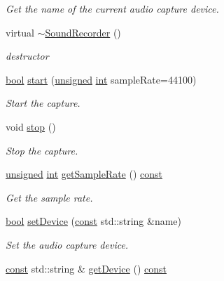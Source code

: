 \begin{DoxyCompactItemize}
\begin{DoxyCompactList}\small\item\em Get the name of the current audio capture device. \end{DoxyCompactList}\item 
virtual \hyperlink{classsf_1_1_sound_recorder_acc599e61aaa47edaae88cf43f0a43549}{$\sim$\-Sound\-Recorder} ()
\begin{DoxyCompactList}\small\item\em destructor \end{DoxyCompactList}\item 
\hyperlink{term__entry_8h_a002004ba5d663f149f6c38064926abac}{bool} \hyperlink{classsf_1_1_sound_recorder_a715f0fd2f228c83d79aaedca562ae51f}{start} (\hyperlink{curses_8priv_8h_aca40206900cfc164654362fa8d4ad1e6}{unsigned} \hyperlink{term__entry_8h_ad65b480f8c8270356b45a9890f6499ae}{int} sample\-Rate=44100)
\begin{DoxyCompactList}\small\item\em Start the capture. \end{DoxyCompactList}\item 
void \hyperlink{classsf_1_1_sound_recorder_a8d9c8346aa9aa409cfed4a1101159c4c}{stop} ()
\begin{DoxyCompactList}\small\item\em Stop the capture. \end{DoxyCompactList}\item 
\hyperlink{curses_8priv_8h_aca40206900cfc164654362fa8d4ad1e6}{unsigned} \hyperlink{term__entry_8h_ad65b480f8c8270356b45a9890f6499ae}{int} \hyperlink{classsf_1_1_sound_recorder_a1f3726cbe0a2b2b291b36beea57960d7}{get\-Sample\-Rate} () \hyperlink{term__entry_8h_a57bd63ce7f9a353488880e3de6692d5a}{const} 
\begin{DoxyCompactList}\small\item\em Get the sample rate. \end{DoxyCompactList}\item 
\hyperlink{term__entry_8h_a002004ba5d663f149f6c38064926abac}{bool} \hyperlink{classsf_1_1_sound_recorder_a8eb3e473292c16e874322815836d3cd3}{set\-Device} (\hyperlink{term__entry_8h_a57bd63ce7f9a353488880e3de6692d5a}{const} std\-::string \&name)
\begin{DoxyCompactList}\small\item\em Set the audio capture device. \end{DoxyCompactList}\item 
\hyperlink{term__entry_8h_a57bd63ce7f9a353488880e3de6692d5a}{const} std\-::string \& \hyperlink{classsf_1_1_sound_recorder_a911218297b0fb5c050b3e34e6ba1d38e}{get\-Device} () \hyperlink{term__entry_8h_a57bd63ce7f9a353488880e3de6692d5a}{const} 

\end{DoxyCompactItemize}
